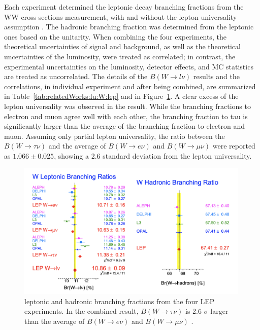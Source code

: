 Each experiment determined the leptonic \PW decay branching fractions from the WW cross-sections measurement, with and without the lepton universality assumption \cite{Schael:2013ita}. The hadronic branching fraction was determined from the leptonic ones based on the unitarity. When combining the four experiments, the theoretical uncertainties of signal and background, as well as the theoretical uncertainties of the luminosity, were treated as correlated; in contrast, the experimental uncertainties on the luminosity, detector effects, and MC statistics are treated as uncorrelated. The details of the $B(W\to l \nu)$ results and the correlations, in individual experiment and after being combined, are summarized in Table~\ref{tab:relatedWorks:lu:W:lep} and in Figure~\ref{fig:relatedWorks:lu:W:lep}. A clear excess of the lepton universality was observed in the result. While the branching fractions to electron and muon agree well with each other, the branching fraction to tau is significantly larger than the average of the branching fraction to electron and muon. Assuming only partial lepton universality, the ratio between the $B(W\to \tau \nu)$ and the average of $B(W\to e \nu)$ and $B(W\to \mu \nu)$ were reported as \cite{Schael:2013ita} $1.066 \pm 0.025$, showing a 2.6 standard deviation from the lepton universality.


\begin{figure}[ht]
    \centering
    \includegraphics[width=0.99\textwidth]{chapters/RelatedWorks/sectionLU/figures/lepResult.png}
    \caption{\PW leptonic and hadronic branching fractions from the four LEP experiments. In the combined result, $B(W\to \tau \nu)$  is 2.6 $\sigma$ larger than the average of $B(W\to e \nu)$ and $B(W\to \mu \nu)$ \cite{Schael:2013ita}. }
    \label{fig:relatedWorks:lu:W:lep}
\end{figure}

